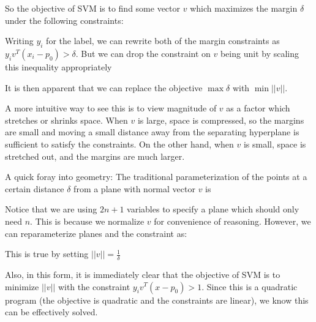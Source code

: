 \documentclass[12pt]{article}
\begin{document}
So the objective of SVM is to find some vector $v$ which maximizes the margin $\delta$ under the following constraints:


Writing $y_i$ for the label, we can rewrite both of the margin constraints as $y_i v^T(x_i -p_0) > \delta$. But we can drop the constraint on $v$ being unit by scaling this inequality appropriately


It is then apparent that we can replace the objective $\max \delta$ with $\min ||v||$.

A more intuitive way to see this is to view magnitude of $v$ as a factor which stretches or shrinks space. When $v$ is large, space is compressed, so the margins are small and moving a small distance away from the separating hyperplane is sufficient to satisfy the constraints. On the other hand, when $v$ is small, space is stretched out, and the margins are much larger.

A quick foray into geometry:
The traditional parameterization of the points at a certain distance $\delta$ from a plane with normal vector $v$ is

Notice that we are using $2n+1$ variables to specify a plane which should only need $n$. This is because we normalize $v$ for convenience of reasoning. However, we can reparameterize planes and the constraint as:

This is true by setting $||v|| = \frac{1}{\delta}$

\iffalse
This can be derived by using the magnitude of $v$ to indicate the offset of the plane. By setting

\eq{
  ||v|| &= \frac{1-v^Tp_0}{\delta} \\
  \delta &= \frac{1-v^Tp_0}{||v||}
  \intertext{We can plug this back into the original expression to get}
  \frac{1}{||v||}v^T(x-p_0) &= \frac{1-v^Tp_0}{||v||}\\
  v^Tx - v^Tp_0 &= 1-v^Tp_0 \\
  v^Tx &= 1
}
\fi

Also, in this form, it is immediately clear that the objective of SVM is to minimize $||v||$ with the constraint $y_i v^T(x-p_0) > 1$. Since this is a quadratic program (the objective is quadratic and the constraints are linear), we know this can be effectively solved.
\end{document}
